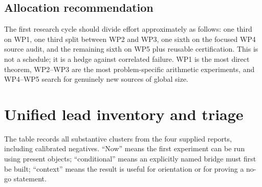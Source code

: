 \documentclass[10pt,letterpaper]{article}
\begin{document}
\subsection{Allocation recommendation}

The first research cycle should divide effort approximately as follows: one third on WP1,
one third split between WP2 and WP3, one sixth on the focused WP4 source audit, and the
remaining sixth on WP5 plus reusable certification.  This is not a schedule; it is a hedge
against correlated failure.  WP1 is the most direct theorem, WP2--WP3 are the most
problem-specific arithmetic experiments, and WP4--WP5 search for genuinely new sources of
global size.

\clearpage
\section{Unified lead inventory and triage}
\label{sec:inventory}

The table records all substantive clusters from the four supplied reports, including
calibrated negatives.  ``Now'' means the first experiment can be run using present objects;
``conditional'' means an explicitly named bridge must first be built; ``context'' means the
result is useful for orientation or for proving a no-go statement.
\end{document}
